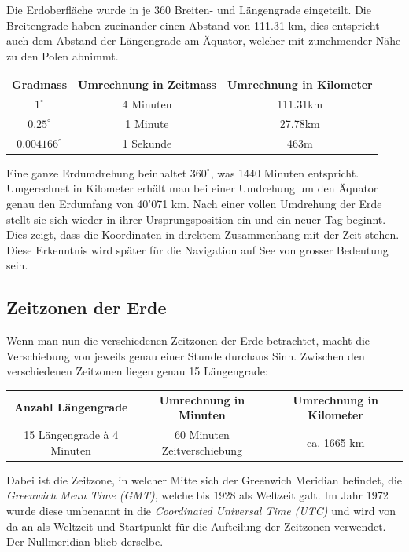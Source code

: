 \begin{refsection}
Die Erdoberfläche wurde in je 360 Breiten- und Längengrade eingeteilt. Die Breitengrade haben zueinander einen Abstand von 111.31 km, dies entspricht auch dem Abstand der Längengrade am Äquator, welcher mit zunehmender Nähe zu den Polen abnimmt.
\begin{center}
\renewcommand{\arraystretch}{1.5}
\begin{tabular}{ccc}
\textbf{Gradmass} & \textbf{Umrechnung in Zeitmass} & \textbf{Umrechnung in Kilometer}  \\
$1^{\circ}$ & 4 Minuten & 111.31km \\
$0.25^{\circ}$ & 1 Minute & 27.78km \\
$0.004166^{\circ}$ & 1 Sekunde & 463m 
\label {V7}
\end{tabular}
\end{center}
 
Eine ganze Erdumdrehung beinhaltet $360 ^{\circ}$, was 1440 Minuten entspricht. Umgerechnet in Kilometer erhält man bei einer Umdrehung um den Äquator genau den Erdumfang von 40’071 km.
Nach einer vollen Umdrehung der Erde stellt sie sich wieder in ihrer Ursprungsposition ein und ein neuer Tag beginnt. Dies zeigt, dass die Koordinaten in direktem Zusammenhang mit der Zeit stehen. Diese Erkenntnis wird später für die Navigation auf See von grosser Bedeutung sein.


\subsection{Zeitzonen der Erde} \label{Zeitzonen} 
Wenn man nun die verschiedenen Zeitzonen der Erde betrachtet, macht die Verschiebung von jeweils genau einer Stunde durchaus Sinn.
Zwischen den verschiedenen Zeitzonen liegen genau 15 Längengrade:
\begin{center}
\renewcommand{\arraystretch}{1.5}
\begin{tabular}{ccc}
\textbf{Anzahl Längengrade} & \textbf{Umrechnung in Minuten} & \textbf{Umrechnung in Kilometer}  \\
15 Längengrade à 4 Minuten & 60 Minuten Zeitverschiebung & ca. 1665 km \\
\end{tabular}
\end{center}

Dabei ist die Zeitzone, in welcher Mitte sich der Greenwich Meridian befindet, die \textit{Greenwich Mean Time (GMT)}, welche bis 1928 als Weltzeit galt. Im Jahr 1972 wurde diese umbenannt in die \textit{Coordinated Universal Time (UTC)} und wird von da an als Weltzeit und Startpunkt für die Aufteilung der Zeitzonen verwendet. Der Nullmeridian blieb derselbe.



\end{refsection}
